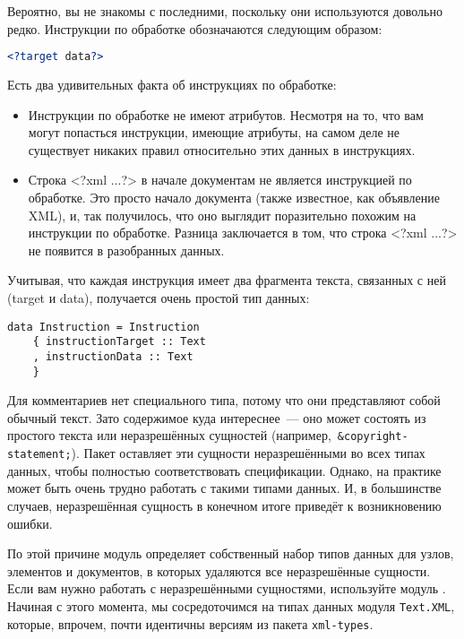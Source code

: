 \begin{remark}
Вероятно, вы не знакомы с последними, поскольку они используются довольно редко. Инструкции по обработке обозначаются следующим образом:
\begin{lstlisting}[language=XML]
<?target data?>
\end{lstlisting}

Есть два удивительных факта об инструкциях по обработке:
\begin{itemize}
\item Инструкции по обработке не имеют атрибутов. Несмотря на то, что вам могут попасться инструкции, имеющие атрибуты, на самом деле не существует никаких правил относительно этих данных в инструкциях.
\item Строка <?xml ...?> в начале документам не является инструкцией по обработке. Это просто начало документа (также известное, как объявление XML), и, так получилось, что оно выглядит поразительно похожим на инструкции по обработке. Разница заключается в том, что строка <?xml ...?> не появится в разобранных данных.
\end{itemize}

\end{remark}

Учитывая, что каждая инструкция имеет два фрагмента текста, связанных с ней (target и data), получается очень простой тип данных:
\begin{lstlisting}
data Instruction = Instruction
    { instructionTarget :: Text
    , instructionData :: Text
    }
\end{lstlisting}

Для комментариев нет специального типа, потому что они представляют собой обычный текст. Зато содержимое куда интереснее~--- оно может состоять из простого текста или неразрешённых сущностей (например,~\lstinline!&copyright-statement;!). Пакет  оставляет эти сущности неразрешёнными во всех типах данных, чтобы полностью соответствовать спецификации. Однако, на практике может быть очень трудно работать с такими типами данных. И, в большинстве случаев, неразрешённая сущность в конечном итоге приведёт к возникновению ошибки.

По этой причине модуль  определяет собственный набор типов данных для узлов, элементов и документов, в которых удаляются все неразрешённые сущности. Если вам нужно работать с неразрешёнными сущностями, используйте модуль . Начиная с этого момента, мы сосредоточимся на типах данных модуля \lstinline!Text.XML!, которые, впрочем, почти идентичны версиям из пакета \lstinline!xml-types!.

